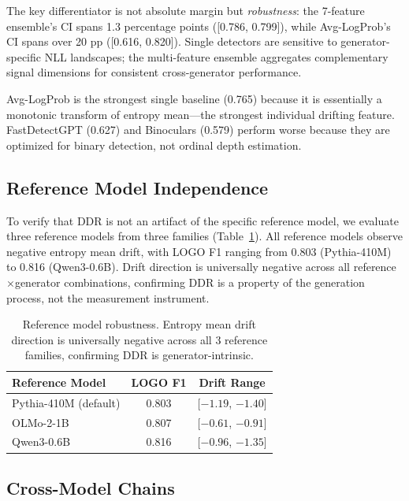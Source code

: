 \documentclass[11pt]{article}
\begin{document}
The key differentiator is not absolute margin but \emph{robustness}: the 7-feature ensemble's CI spans 1.3 percentage points ([0.786, 0.799]), while Avg-LogProb's CI spans over 20 pp ([0.616, 0.820]). Single detectors are sensitive to generator-specific NLL landscapes; the multi-feature ensemble aggregates complementary signal dimensions for consistent cross-generator performance.

Avg-LogProb is the strongest single baseline (0.765) because it is essentially a monotonic transform of entropy mean---the strongest individual drifting feature. FastDetectGPT (0.627) and Binoculars (0.579) perform worse because they are optimized for binary detection, not ordinal depth estimation.

\subsection{Reference Model Independence}
\label{sec:ref_model}

To verify that DDR is not an artifact of the specific reference model, we evaluate three reference models from three families (Table~\ref{tab:refmodel}). All reference models observe negative entropy mean drift, with LOGO F1 ranging from 0.803 (Pythia-410M) to 0.816 (Qwen3-0.6B). Drift direction is universally negative across all reference$\times$generator combinations, confirming DDR is a property of the generation process, not the measurement instrument.

\begin{table}[t]
\centering
\small
\begin{tabular}{lcc}
\toprule
\textbf{Reference Model} & \textbf{LOGO F1} & \textbf{Drift Range} \\
\midrule
Pythia-410M (default) & 0.803 & [$-1.19$, $-1.40$] \\
OLMo-2-1B & 0.807 & [$-0.61$, $-0.91$] \\
Qwen3-0.6B & 0.816 & [$-0.96$, $-1.35$] \\
\bottomrule
\end{tabular}
\caption{Reference model robustness. Entropy mean drift direction is universally negative across all 3 reference families, confirming DDR is generator-intrinsic.}
\label{tab:refmodel}
\end{table}

\subsection{Cross-Model Chains}
\label{sec:cross_model}
\end{document}
